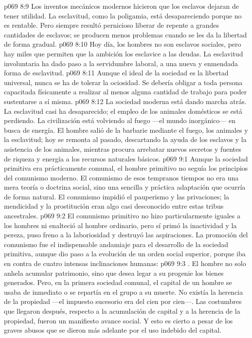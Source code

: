 \vs p069 8:9 \pc Los inventos mecánicos modernos hicieron que los esclavos dejaran de tener utilidad. La esclavitud, como la poligamia, está desapareciendo porque no es rentable. Pero siempre resultó pernicioso liberar de repente a grandes cantidades de esclavos; se producen menos problemas cuando se les da la libertad de forma gradual.
\vs p069 8:10 \pc Hoy día, los hombres no son esclavos sociales, pero hay miles que permiten que la ambición los esclavice a las deudas. La esclavitud involuntaria ha dado paso a la servidumbre laboral, a una nueva y enmendada forma de esclavitud.
\vs p069 8:11 Aunque el ideal de la sociedad es la libertad universal, nunca se ha de tolerar la ociosidad. Se debería obligar a toda persona capacitada físicamente a realizar al menos alguna cantidad de trabajo para poder sustentarse a sí misma.
\vs p069 8:12 La sociedad moderna está dando marcha atrás. La esclavitud casi ha desaparecido; el empleo de los animales domésticos se está perdiendo. La civilización está volviendo al fuego ---el mundo inorgánico--- en busca de energía. El hombre salió de la barbarie mediante el fuego, los animales y la esclavitud; hoy se remonta al pasado, descartando la ayuda de los esclavos y la asistencia de los animales, mientras procura arrebatar nuevos secretos y fuentes de riqueza y energía a los recursos naturales básicos.
\vs p069 9:1 Aunque la sociedad primitiva era prácticamente comunal, el hombre primitivo no seguía los principios del comunismo moderno. El comunismo de esos tempranos tiempos no era una mera teoría o doctrina social, sino una sencilla y práctica adaptación que ocurría de forma natural. El comunismo impidió el pauperismo y las privaciones; la mendicidad y la prostitución eran algo casi desconocido entre estas tribus ancestrales.
\vs p069 9:2 \pc El comunismo primitivo no hizo particularmente iguales a los hombres ni enalteció al hombre ordinario, pero sí primó la inactividad y la pereza, puso freno a la laboriosidad y destruyó las aspiraciones. La promoción del comunismo fue el indispensable andamiaje para el desarrollo de la sociedad primitiva, aunque dio paso a la evolución de un orden social superior, porque iba en contra de cuatro intensas inclinaciones humanas:
\vs p069 9:3 . El hombre no solo anhela acumular patrimonio, sino que desea legar a su progenie los bienes generados. Pero, en la primera sociedad comunal, el capital de un hombre se usaba de inmediato o se repartía en el grupo a su muerte. No existía la herencia de la propiedad ---el impuesto sucesorio era del cien por cien---. Las costumbres que llegaron después, respecto a la acumulación de capital y a la herencia de la propiedad, fueron un manifiesto avance social. Y esto es cierto a pesar de los graves abusos que se dieron más adelante por el uso indebido del capital.
